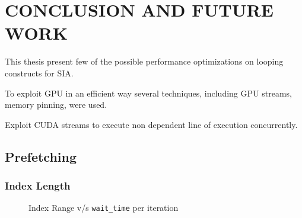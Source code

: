 \chapter{CONCLUSION AND FUTURE WORK}\label{conclusion}

This thesis present few of the possible performance optimizations on looping
constructs for SIA.

To exploit GPU in an efficient way several techniques, including GPU streams,
memory pinning, were used.

Exploit CUDA streams to execute non dependent line of execution concurrently.

\section{Prefetching}
\subsection{Index Length}
\begin{figure}[h]
  \centering
  
  \caption{Index Range v/s \texttt{wait\_time} per iteration}
\end{figure}